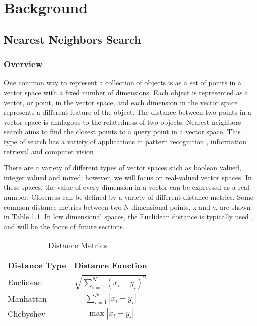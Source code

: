 \chapter{Background} %

\label{Background} %


\section{Nearest Neighbors Search}

\subsection{Overview}
\label{sec:overview}

One common way to represent a collection of objects is as a set of points in a vector space with a fixed number of dimensions.  Each object is represented as a vector, or point, in the vector space, and each dimension in the vector space represents a different feature of the object.  The distance between two points in a vector space is analagous to the relatedness of two objects.  Nearest neighbors search aims to find the closest points to a query point in a vector space.  This type of search has a variety of applications in pattern recognition \citep{cover1967nearest}, information retrieval \citep{manning2008introduction} and computer vision \citep{boiman2008defense}.

There are a variety of different types of vector spaces such as boolean valued, integer valued and mixed; however, we will focus on real-valued vector spaces.  In these spaces, the value of every dimension in a vector can be expressed as a real number.  Closeness can be defined by a variety of different distance metrics.  Some common distance metrics between two N-dimensional points, x and y, are shown in Table \ref{table:distancemet}.  In low dimensional spaces, the Euclidean distance is typically used \citep{danielsson1980euclidean}, and will be the focus of future sections.

\begin{table}
\centering
\begin{tabular}{ | l | c |}
	\hline
	Distance Type & Distance Function \\
	\hline
	Euclidean & $\sqrt{\sum\limits_{i=1}^N (x_i - y_i)^2}$ \\
	\hline
	Manhattan & $\sum\limits_{i=1}^N |x_i - y_i|$ \\
	\hline
	Chebyshev & $\max{|x_i - y_i|}$ \\
	\hline
\end{tabular}
\caption{Distance Metrics}
\label{table:distancemet}
\end{table}

